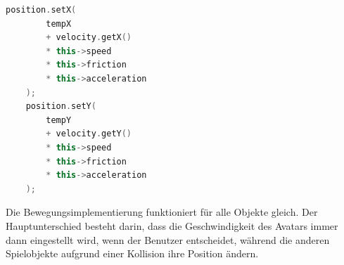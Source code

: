 \documentclass[
  10pt,
  a4paper,
  oneside,
  headers,
  headinclude,
  footinclude,
  BCOR5mm,
]{article}
\begin{document}
\begin{lstlisting}[language=C++]
    position.setX(
        tempX
        + velocity.getX()
        * this->speed
        * this->friction
        * this->acceleration
    );
    position.setY(
        tempY
        + velocity.getY()
        * this->speed
        * this->friction
        * this->acceleration
    );
\end{lstlisting}

Die Bewegungsimplementierung funktioniert für alle Objekte gleich. Der Hauptunterschied besteht darin, dass die Geschwindigkeit des Avatars immer dann eingestellt wird, wenn der Benutzer entscheidet, während die anderen Spielobjekte aufgrund einer Kollision ihre Position ändern.
\end{document}
